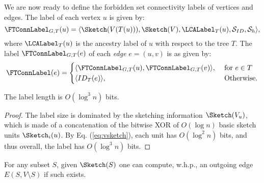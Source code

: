 We are now ready to define the forbidden set  connectivity labels of vertices and edges. 
The label of each vertex $u$ is given by:
$$\FTConnLabel_{G,T}(u)=\langle \Sketch(V(T(u))), \Sketch(V), \LCALabel_T(u), \mathcal{S}_{ID}, \mathcal{S}_h\rangle,$$ 
where $\LCALabel_T(u)$ is the ancestry label of $u$ with respect to the tree $T$.
The label $\FTConnLabel_{G,T}(e)$ of each \emph{edge} $e=(u,v)$ is as given by:
\begin{equation*}
    \FTConnLabel(e)=
    \begin{cases}
      \langle \FTConnLabel_{G,T}(u), \FTConnLabel_{G,T}(v)\rangle ,& \mbox{~for~} e \in T \\
     \langle ID_T(e) \rangle,& \mbox{~Otherwise}.
    \end{cases}
\end{equation*}


\begin{claim}
The label length is $O(\log^3 n)$ bits.
\end{claim}
\begin{proof}
The label size is dominated by the sketching information $\Sketch(V_u)$, which is made of a concatenation of the bitwise XOR of $O(\log n)$ basic sketch units $\Sketch_i(u)$. By Eq. (\ref{eq:vsketch}), each unit has $O(\log^2 n)$ bits, and thus overall, the label has $O(\log^3 n)$ bits.
\end{proof}


\begin{lemma}\label{lem:sketch-property}
For any subset $S$, given $\Sketch(S)$ one can compute, w.h.p., an outgoing edge $E(S, V \setminus S)$ if such exists. 
\end{lemma}


